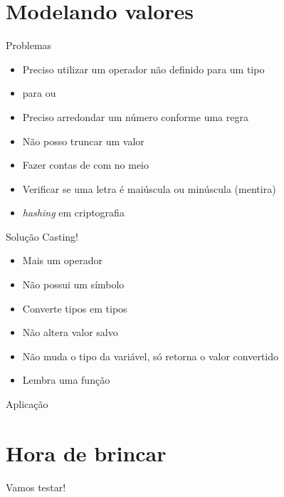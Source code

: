 \documentclass[14pt]{beamer}
\subtitle{Truncando}
\begin{document}
	
	\begin{frame}
		\titlepage
	\end{frame}

	\begin{frame}
		\tableofcontents
	\end{frame}

	\section{Modelando valores}
	\begin{frame}{Problemas}
		\begin{itemize}
			\presentationPause\item Preciso utilizar um operador não definido para um tipo
			\presentationPause\item \basicCode{\%} para  ou \basicCode{double}
			\presentationPause\item Preciso arredondar um número conforme uma regra
			\presentationPause\item Não posso truncar um valor
			\presentationPause\item Fazer contas de  com  no meio
			\presentationPause\item Verificar se uma letra é maiúscula ou minúscula \presentationPause(mentira)
			\presentationPause\item \textit{hashing} em criptografia
		\end{itemize}
	\end{frame}

	\begin{frame}{Solução}
		Casting!
		\begin{itemize}
			\presentationPause\item Mais um operador
			\presentationPause\item Não possui um símbolo \presentationPause\frownie
			\presentationPause\item Converte tipos em tipos
			\presentationPause\item Não altera valor salvo
			\presentationPause\item Não muda o tipo da variável, só retorna o valor convertido
			\presentationPause\item Lembra uma função
		\end{itemize}
		\presentationPause
	\end{frame}
	
	\begin{frame}{Aplicação}
		\presentationPause
	\end{frame}


	\section{Hora de brincar}
		\begin{frame}
			\begin{center}\Huge
				Vamos testar!
			\end{center}
		\end{frame}
\end{document}
